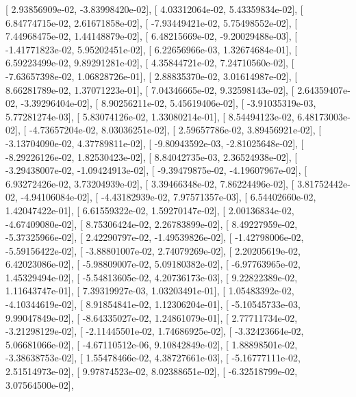 \documentclass{article}
\begin{document}
       [  2.93856909e-02,  -3.83998420e-02],
       [  4.03312064e-02,   5.43359834e-02],
       [  6.84774715e-02,   2.61671858e-02],
       [ -7.93449421e-02,   5.75498552e-02],
       [  7.44968475e-02,   1.44148879e-02],
       [  6.48215669e-02,  -9.20029488e-03],
       [ -1.41771823e-02,   5.95202451e-02],
       [  6.22656966e-03,   1.32674684e-01],
       [  6.59223499e-02,   9.89291281e-02],
       [  4.35844721e-02,   7.24710560e-02],
       [ -7.63657398e-02,   1.06828726e-01],
       [  2.88835370e-02,   3.01614987e-02],
       [  8.66281789e-02,   1.37071223e-01],
       [  7.04346665e-02,   9.32598143e-02],
       [  2.64359407e-02,  -3.39296404e-02],
       [  8.90256211e-02,   5.45619406e-02],
       [ -3.91035319e-03,   5.77281274e-03],
       [  5.83074126e-02,   1.33080214e-01],
       [  8.54494123e-02,   6.48173003e-02],
       [ -4.73657204e-02,   8.03036251e-02],
       [  2.59657786e-02,   3.89456921e-02],
       [ -3.13704090e-02,   4.37789811e-02],
       [ -9.80943592e-03,  -2.81025648e-02],
       [ -8.29226126e-02,   1.82530423e-02],
       [  8.84042735e-03,   2.36524938e-02],
       [ -3.29438007e-02,  -1.09424913e-02],
       [ -9.39479875e-02,  -4.19607967e-02],
       [  6.93272426e-02,   3.73204939e-02],
       [  3.39466348e-02,   7.86224496e-02],
       [  3.81752442e-02,  -4.94106084e-02],
       [ -4.43182939e-02,   7.97571357e-03],
       [  6.54402660e-02,   1.42047422e-01],
       [  6.61559322e-02,   1.59270147e-02],
       [  2.00136834e-02,  -4.67409080e-02],
       [  8.75306424e-02,   2.26783899e-02],
       [  8.49227959e-02,  -5.37325966e-02],
       [  2.42290797e-02,  -1.49539826e-02],
       [ -1.42798006e-02,  -5.59156422e-02],
       [ -3.88801007e-02,   2.74079269e-02],
       [  2.20205619e-02,   6.42023086e-02],
       [ -5.98809007e-02,   5.09180382e-02],
       [ -6.97763965e-02,   1.45329494e-02],
       [ -5.54813605e-02,   4.20736173e-03],
       [  9.22822389e-02,   1.11643747e-01],
       [  7.39319927e-03,   1.03203491e-01],
       [  1.05483392e-02,  -4.10344619e-02],
       [  8.91854841e-02,   1.12306204e-01],
       [ -5.10545733e-03,   9.99047849e-02],
       [ -8.64335027e-02,   1.24861079e-01],
       [  2.77711734e-02,  -3.21298129e-02],
       [ -2.11445501e-02,   1.74686925e-02],
       [ -3.32423664e-02,   5.06681066e-02],
       [ -4.67110512e-06,   9.10842849e-02],
       [  1.88898501e-02,  -3.38638753e-02],
       [  1.55478466e-02,   4.38727661e-03],
       [ -5.16777111e-02,   2.51514973e-02],
       [  9.97874523e-02,   8.02388651e-02],
       [ -6.32518799e-02,   3.07564500e-02],
\end{document}
